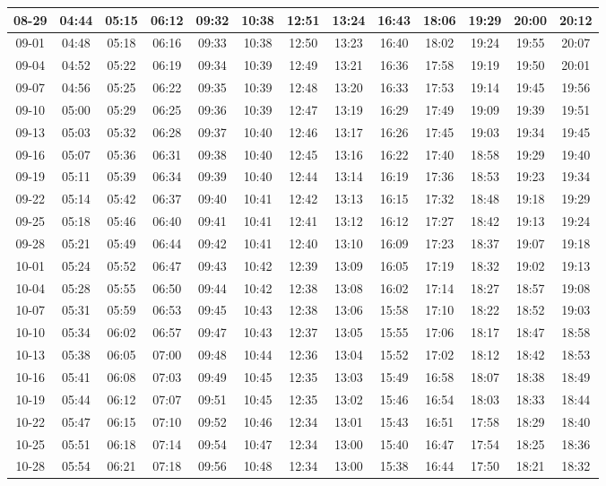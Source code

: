 \begin{footnotesize}
\begin{longtable}{c | c | c | c | c | c | c | c | c | c | c | c | c}
		08-29&04:44&05:15&06:12&09:32&10:38&12:51&13:24&16:43&18:06&19:29&20:00&20:12\\\hline
		09-01&04:48&05:18&06:16&09:33&10:38&12:50&13:23&16:40&18:02&19:24&19:55&20:07\\\hline
		09-04&04:52&05:22&06:19&09:34&10:39&12:49&13:21&16:36&17:58&19:19&19:50&20:01\\\hline
		09-07&04:56&05:25&06:22&09:35&10:39&12:48&13:20&16:33&17:53&19:14&19:45&19:56\\\hline
		09-10&05:00&05:29&06:25&09:36&10:39&12:47&13:19&16:29&17:49&19:09&19:39&19:51\\\hline
		09-13&05:03&05:32&06:28&09:37&10:40&12:46&13:17&16:26&17:45&19:03&19:34&19:45\\\hline
		09-16&05:07&05:36&06:31&09:38&10:40&12:45&13:16&16:22&17:40&18:58&19:29&19:40\\\hline
		09-19&05:11&05:39&06:34&09:39&10:40&12:44&13:14&16:19&17:36&18:53&19:23&19:34\\\hline
		09-22&05:14&05:42&06:37&09:40&10:41&12:42&13:13&16:15&17:32&18:48&19:18&19:29\\\hline
		09-25&05:18&05:46&06:40&09:41&10:41&12:41&13:12&16:12&17:27&18:42&19:13&19:24\\\hline
		09-28&05:21&05:49&06:44&09:42&10:41&12:40&13:10&16:09&17:23&18:37&19:07&19:18\\\hline
		10-01&05:24&05:52&06:47&09:43&10:42&12:39&13:09&16:05&17:19&18:32&19:02&19:13\\\hline
		10-04&05:28&05:55&06:50&09:44&10:42&12:38&13:08&16:02&17:14&18:27&18:57&19:08\\\hline
		10-07&05:31&05:59&06:53&09:45&10:43&12:38&13:06&15:58&17:10&18:22&18:52&19:03\\\hline
		10-10&05:34&06:02&06:57&09:47&10:43&12:37&13:05&15:55&17:06&18:17&18:47&18:58\\\hline
		10-13&05:38&06:05&07:00&09:48&10:44&12:36&13:04&15:52&17:02&18:12&18:42&18:53\\\hline
		10-16&05:41&06:08&07:03&09:49&10:45&12:35&13:03&15:49&16:58&18:07&18:38&18:49\\\hline
		10-19&05:44&06:12&07:07&09:51&10:45&12:35&13:02&15:46&16:54&18:03&18:33&18:44\\\hline
		10-22&05:47&06:15&07:10&09:52&10:46&12:34&13:01&15:43&16:51&17:58&18:29&18:40\\\hline
		10-25&05:51&06:18&07:14&09:54&10:47&12:34&13:00&15:40&16:47&17:54&18:25&18:36\\\hline
		10-28&05:54&06:21&07:18&09:56&10:48&12:34&13:00&15:38&16:44&17:50&18:21&18:32\\\hline

\end{longtable}
\end{footnotesize}
